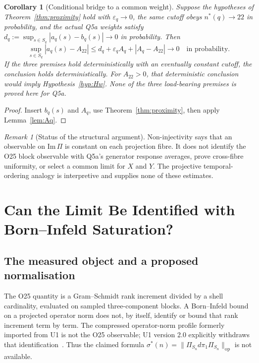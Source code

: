 \documentclass[12pt]{article}
\newtheorem{corollary}[theorem]{Corollary}
\theoremstyle{definition}
\theoremstyle{remark}
\newtheorem{remark}[theorem]{Remark}
\DeclareMathOperator{\op}{op}
\begin{document}
  \begin{corollary}[Conditional bridge to a common weight]
    \label{cor:Hw}
    Suppose the hypotheses of Theorem~\ref{thm:proximity} hold with
    $\varepsilon_q\to0$, the same cutoff obeys $n^*(q)\to22$ in
    probability, and the actual Q5a weights satisfy
    $d_q:=\sup_{s\in S_q}|a_q(s)-b_q(s)|\to0$ in probability.
    Then
    \begin{equation}
      \label{eq:Hw-rate}
      \sup_{s\in S_q}|a_q(s)-A_{22}|
      \le d_q+\varepsilon_q A_q+|A_q-A_{22}|
      \longrightarrow0
      \quad\text{in probability}.
    \end{equation}
    If the three premises hold deterministically with an eventually
    constant cutoff, the conclusion holds deterministically.
    For $A_{22}>0$, that deterministic conclusion would imply
    Hypothesis~\ref{hyp:Hw}.
    None of the three load-bearing premises is proved here for Q5a.
  \end{corollary}

  \begin{proof}
    Insert $b_q(s)$ and $A_q$, use Theorem~\ref{thm:proximity},
    then apply Lemma~\ref{lem:Aq}.
  \end{proof}

  \begin{remark}[Status of the structural argument]
    \label{rem:PTO}
    Non-injectivity says that an observable on $\mathrm{Im}\,\Pi$ is
    constant on each projection fibre.
    It does not identify the O25 block observable with Q5a's generator
    response averages, prove cross-fibre uniformity, or select a common
    limit for $X$ and $Y$.
    The projective temporal-ordering analogy is interpretive and
    supplies none of these estimates.
  \end{remark}

  \section{Can the Limit Be Identified with Born--Infeld Saturation?}
  \label{sec:A}

  \subsection{The measured object and a proposed normalisation}

  The O25 quantity is a Gram--Schmidt rank increment divided by a shell
  cardinality, evaluated on sampled three-component blocks.
  A Born--Infeld bound on a projected operator norm does not, by itself,
  identify or bound that rank increment term by term.
  The compressed operator-norm profile formerly imported from U1 is not
  the O25 observable; U1 version 2.0 explicitly withdraws that
  identification~\cite{Beau2026u1}.
  Thus the claimed formula
  $\sigma^*(n)=\|\Pi_{S_n}d\pi_1\Pi_{S_n}\|_{\op}$ is not available.
\end{document}
